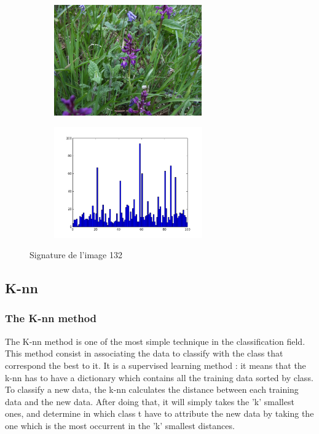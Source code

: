 \documentclass[12pt]{article}
\begin{document}
\begin{figure}[h]
        \centering
        \begin{subfigure}[b]{0.5\textwidth}
                \centering
                \includegraphics[height=180px]{132.jpg}
        \end{subfigure}%
        \hfill
        \begin{subfigure}[b]{0.5\textwidth}
                \centering
                \includegraphics[height=180px]{132_sig.png}
        \end{subfigure}
        \caption{Signature de l'image 132}
        \label{fig:signature1}
\end{figure}

\subsection{K-nn}
\subsubsection{The K-nn method}
The K-nn method is one of the most simple technique in the classification field. This method consist in associating the data to classify with the class that correspond the best to it.
It is a supervised learning method : it means that the k-nn has to have a dictionary which contains all the training data sorted by class. To classify a new data, the k-nn calculates the distance between each training data and the new data. After doing that, it will simply takes the 'k' smallest ones, and determine in which class t have to attribute the new data by taking the one which is the most occurrent in the 'k' smallest distances.
\end{document}
